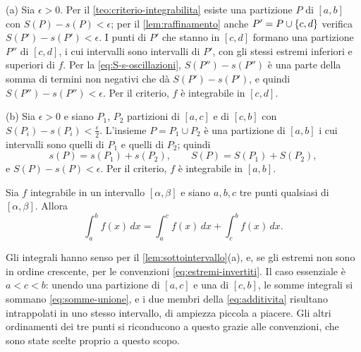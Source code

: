 \begin{dimostrazione}
(a) Sia $\epsilon>0$. Per il \cref{teo:criterio-integrabilita} esiste una partizione $P$
di $[a,b]$ con $S(P)-s(P)<\epsilon$; per il \cref{lem:raffinamento} anche
$P'=P\cup\left\{ c,d \right\}$ verifica $S(P')-s(P')<\epsilon$. I punti di $P'$ che stanno in
$[c,d]$ formano una partizione $P''$ di $[c,d]$, i cui intervalli sono intervalli di
$P'$, con gli stessi estremi inferiori e superiori di $f$. Per la
\eqref{eq:S-s-oscillazioni}, $S(P'')-s(P'')$ è una parte della somma di termini non
negativi che dà $S(P')-s(P')$, e quindi $S(P'')-s(P'')<\epsilon$. Per il criterio, $f$ è
integrabile in $[c,d]$.

(b) Sia $\epsilon>0$ e siano $P_{1}$, $P_{2}$ partizioni di $[a,c]$ e di $[c,b]$ con
$S(P_{i})-s(P_{i})<\frac\epsilon2$. L'insieme $P=P_{1}\cup P_{2}$ è una partizione di
$[a,b]$ i cui intervalli sono quelli di $P_{1}$ e quelli di $P_{2}$; quindi
\begin{equation}\label{eq:somme-unione}
  s(P)=s(P_{1})+s(P_{2}), \qquad S(P)=S(P_{1})+S(P_{2}),
\end{equation}
e $S(P)-s(P)<\epsilon$. Per il criterio, $f$ è integrabile in $[a,b]$.
\end{dimostrazione}

\begin{teorema}\label{teo:additivita}
Sia $f$ integrabile in un intervallo $[\alpha,\beta]$ e siano $a,b,c$ tre punti
qualsiasi di $[\alpha,\beta]$. Allora
\begin{equation}\label{eq:additivita}
  \int_{a}^{b}f(x)\,dx=\int_{a}^{c}f(x)\,dx+\int_{c}^{b}f(x)\,dx .
\end{equation}
\end{teorema}

\begin{schema}
\end{schema}

\begin{strategia}
Gli integrali hanno senso per il \cref{lem:sottointervallo}(a), e, se gli estremi non
sono in ordine crescente, per le convenzioni \eqref{eq:estremi-invertiti}. Il caso
essenziale è $a<c<b$: unendo una partizione di $[a,c]$ e una di $[c,b]$, le somme
integrali si sommano \eqref{eq:somme-unione}, e i due membri della
\eqref{eq:additivita} risultano intrappolati in uno stesso intervallo, di ampiezza
piccola a piacere. Gli altri ordinamenti dei tre punti si riconducono a questo grazie
alle convenzioni, che sono state scelte proprio a questo scopo.
\end{strategia}

